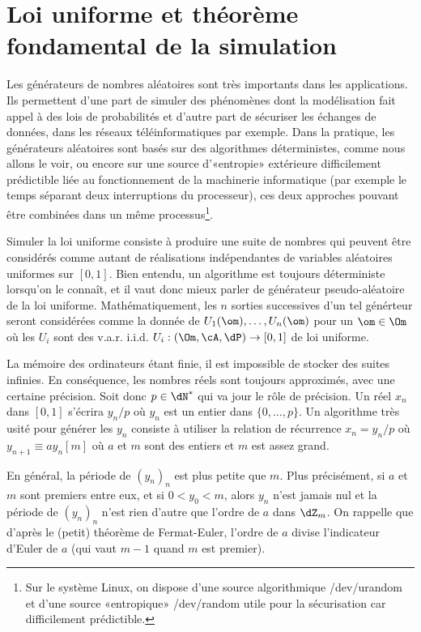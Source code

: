 %
\section{Loi uniforme et théorème fondamental de la simulation}
%

Les générateurs de nombres aléatoires sont très importants dans les
applications. Ils permettent d'une part de simuler des phénomènes dont la
modélisation fait appel à des lois de probabilités et d'autre part de
sécuriser les échanges de données, dans les réseaux téléinformatiques par
exemple. Dans la pratique, les générateurs aléatoires sont basés sur des
algorithmes déterministes, comme nous allons le voir, ou encore sur une source
d'«entropie» extérieure difficilement prédictible liée au fonctionnement de la
machinerie informatique (par exemple le temps séparant deux interruptions du
processeur), ces deux approches pouvant être combinées dans un même
processus\footnote{Sur le système Linux, on dispose d'une source algorithmique
  \textsf{/dev/urandom} et d'une source «entropique» \textsf{/dev/random}
  utile pour la sécurisation car difficilement prédictible.}.

Simuler la loi uniforme consiste à produire une suite de nombres qui peuvent
être considérés comme autant de réalisations indépendantes de variables
aléatoires uniformes sur $[0,1]$. Bien entendu, un algorithme est toujours
déterministe lorsqu'on le connaît, et il vaut donc mieux parler de générateur
pseudo-aléatoire de la loi uniforme. Mathématiquement, les $n$ sorties
successives d'un tel générteur seront considérées comme la donnée de
$U_1(\om),\dots,U_n(\om)$ pour un $\om\in\Om$ où les $U_i$ sont des v.a.r.
i.i.d. $U_i:(\Om,\cA,\dP)\to[0,1]$ de loi uniforme.

La mémoire des ordinateurs étant finie, il est impossible de stocker des
suites infinies. En conséquence, les nombres réels sont toujours approximés,
avec une certaine précision. Soit donc $p\in\dN^*$ qui va jour le rôle de
précision. Un réel $x_n$ dans $[0,1]$ s'écrira $y_n/p$ où $y_n$ est un entier
dans $\{0,\ldots,p\}$. Un algorithme très usité pour générer les $y_n$
consiste à utiliser la relation de récurrence $x_n=y_n/p$ où $y_{n+1}\equiv a
y_n [m]$ où $a$ et $m$ sont des entiers et $m$ est assez grand.

En général, la période de $(y_n)_n$ est plus petite que $m$. Plus précisément,
si $a$ et $m$ sont premiers entre eux, et si $0<y_0<m$, alors $y_n$ n'est
jamais nul et la période de $(y_n)_n$ n'est rien d'autre que l'ordre de $a$
dans $\dZ_m$. On rappelle que d'après le (petit) théorème de Fermat-Euler,
l'ordre de $a$ divise l'indicateur d'Euler de $a$ (qui vaut $m-1$ quand $m$
est premier).

